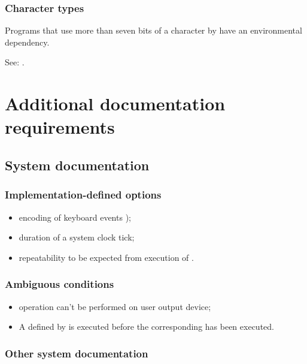 \subsubsection{Character types} %
Programs that use more than seven bits of a character by
 have an environmental dependency.

See: .


\section{Additional documentation requirements} %

\subsection{System documentation} %

\subsubsection{Implementation-defined options} %

\begin{itemize}
\item encoding of keyboard events );
\item duration of a system clock tick;
\item repeatability to be expected from execution of
	.
\end{itemize}

\subsubsection{Ambiguous conditions} %

\begin{itemize}
\item {} operation can't be performed on
	user output device;

\item A  defined by
	is executed before the corresponding \linebreak
	has been executed.
\end{itemize}

\subsubsection{Other system documentation} %

